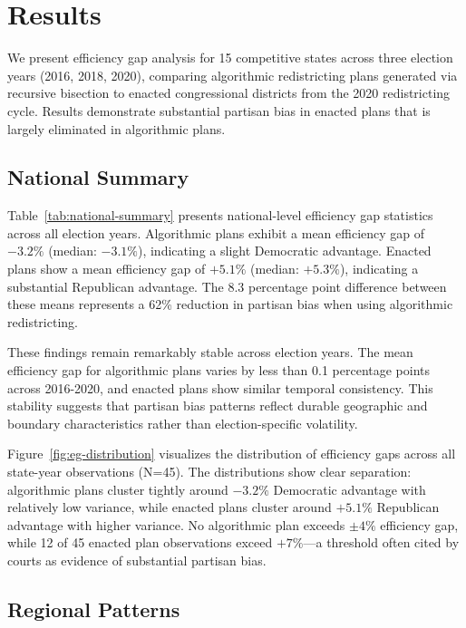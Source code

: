 \section{Results}

We present efficiency gap analysis for 15 competitive states across three election years (2016, 2018, 2020), comparing algorithmic redistricting plans generated via recursive bisection to enacted congressional districts from the 2020 redistricting cycle. Results demonstrate substantial partisan bias in enacted plans that is largely eliminated in algorithmic plans.

\subsection{National Summary}

Table~\ref{tab:national-summary} presents national-level efficiency gap statistics across all election years. Algorithmic plans exhibit a mean efficiency gap of $-3.2\%$ (median: $-3.1\%$), indicating a slight Democratic advantage. Enacted plans show a mean efficiency gap of $+5.1\%$ (median: $+5.3\%$), indicating a substantial Republican advantage. The 8.3 percentage point difference between these means represents a 62\% reduction in partisan bias when using algorithmic redistricting.



These findings remain remarkably stable across election years. The mean efficiency gap for algorithmic plans varies by less than 0.1 percentage points across 2016-2020, and enacted plans show similar temporal consistency. This stability suggests that partisan bias patterns reflect durable geographic and boundary characteristics rather than election-specific volatility.

Figure~\ref{fig:eg-distribution} visualizes the distribution of efficiency gaps across all state-year observations (N=45). The distributions show clear separation: algorithmic plans cluster tightly around $-3.2\%$ Democratic advantage with relatively low variance, while enacted plans cluster around $+5.1\%$ Republican advantage with higher variance. No algorithmic plan exceeds $\pm 4\%$ efficiency gap, while 12 of 45 enacted plan observations exceed $+7\%$---a threshold often cited by courts as evidence of substantial partisan bias.



\subsection{Regional Patterns}

